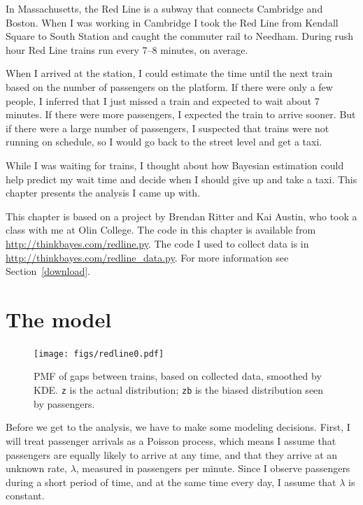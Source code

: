 \documentclass[12pt]{book}
\theoremstyle{exercise}
\begin{document}
In Massachusetts, the Red Line is a subway that connects
Cambridge and Boston.  When I was working in Cambridge I took the Red
Line from Kendall Square to South Station and caught the commuter rail
to Needham.  During rush hour Red Line trains run every 7--8
minutes, on average.

When I arrived at the station, I could estimate the time until
the next train based on the number of passengers on the platform.
If there were only a few people, I inferred that I just missed
a train and expected to wait about 7 minutes.  If there were
more passengers, I expected the train to arrive sooner.  But if
there were a large number of passengers, I suspected that
trains were not running on schedule, so I would go back to the
street level and get a taxi.

While I was waiting for trains, I thought about how Bayesian
estimation could help predict my wait time and decide when I
should give up and take a taxi.  This chapter presents the
analysis I came up with.

This chapter is based on a project by Brendan Ritter and
Kai Austin, who took a class with me at Olin College.
The code in this chapter is available from
\url{http://thinkbayes.com/redline.py}.  The code I used
to collect data is in \url{http://thinkbayes.com/redline_data.py}.
  For more information
see Section~\ref{download}.


\section{The model}

\begin{figure}
\centerline{\texttt{[image: figs/redline0.pdf]}}
\caption{PMF of gaps between trains, based on collected data,
smoothed by KDE.  {\tt z} is the actual distribution; {\tt zb}
is the biased distribution seen by passengers. }
\label{fig.redline0}
\end{figure}

Before we get to the analysis, we have to make some
modeling decisions.  First, I will treat passenger arrivals as
a Poisson process, which means I assume that passengers are equally
likely to arrive at any time, and that they arrive at an unknown
rate, $\lambda$, measured in passengers per minute.  Since I
observe passengers during a short period of time, and at the same
time every day, I assume that $\lambda$ is constant.
\end{document}
